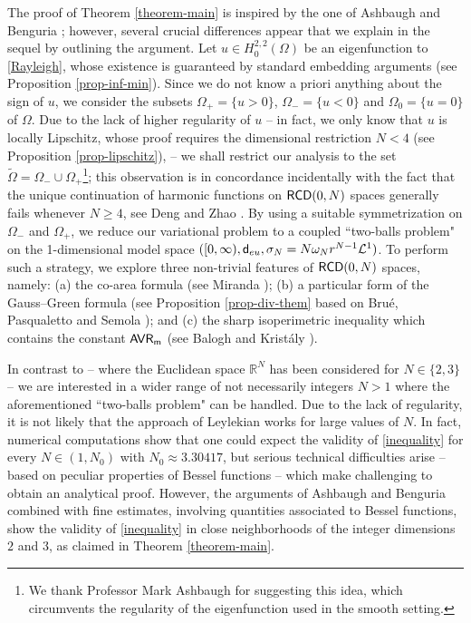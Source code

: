 \documentclass[11pt, reqno]{amsart}
\numberwithin{equation}{section}
\begin{document}
	
		
		The proof of Theorem \ref{theorem-main} is inspired by  the one of Ashbaugh and Benguria \cite{A-B-Duke}; however, several crucial differences appear that we explain in the sequel by outlining the argument. Let $u\in H_0^{2,2}(\Omega)$ be an eigenfunction to \eqref{Rayleigh}, whose existence is guaranteed by standard embedding arguments (see Proposition \ref{prop-inf-min}). Since we do not know a priori anything about the sign of $u$, we consider the subsets $\Omega_+=\{u>0\}$,  $\Omega_-=\{u<0\}$ and $\Omega_0=\{u=0\}$ of $\Omega.$ Due to the lack of higher regularity of $u$ -- in fact, we only know that $u$ is locally Lipschitz, whose proof requires the dimensional restriction $N<4$ (see Proposition \ref{prop-lipschitz}), -- we shall restrict our analysis to the set $\tilde \Omega=\Omega_-\cup \Omega_+$\footnote{We thank Professor Mark Ashbaugh for suggesting  this idea, which circumvents the regularity of the eigenfunction used in the smooth setting.};
		this observation is in concordance incidentally  with  the fact that the unique continuation of harmonic functions on ${\sf RCD}(0,N)$ spaces generally fails whenever $N\geq 4$, see Deng and Zhao \cite{Deng-Zhao}. By using a suitable symmetrization on $\Omega_-$ and $\Omega_+$, we reduce our variational problem to a coupled  ``two-balls problem"  on the 1-dimensional model space $([0,\infty),{\sf d}_{\rm eu},\sigma_N=N\omega_Nr^{N-1}\mathcal L^1)$. To perform such a strategy, we explore three non-trivial features of ${\sf RCD}(0,N)$ spaces, namely: (a) the co-area formula (see Miranda  \cite{Miranda});  (b) a particular form of the Gauss--Green formula (see Proposition \ref{prop-div-them} based on Bru\'e, Pasqualetto and Semola \cite{BPS-ASNS}); and (c) the sharp isoperimetric inequality which contains the constant ${\sf AVR}_ {\sf m}$  (see Balogh and Krist\'aly \cite{BK}). 
				
		 In contrast to \cite{A-B-Duke} -- where the Euclidean space $\mathbb R^N$ has been considered for $N\in \{2,3\}$ -- we are interested in a wider range of not necessarily integers $N>1$  where the aforementioned ``two-balls problem" can be handled. Due to the lack of regularity, it is not likely that the approach of Leylekian \cite{Leylekian-ARMA} works for large values of $N$. In fact, numerical computations show that one could expect the validity of \eqref{inequality} for every $N\in (1,N_0)$ with $N_0\approx 3.30417$, but serious technical difficulties arise -- based on  peculiar properties of Bessel functions --   which make challenging to obtain an analytical proof. However, the arguments of Ashbaugh and Benguria \cite{A-B-Duke} combined with fine estimates, involving quantities associated to Bessel functions, show  the validity of \eqref{inequality} in  close neighborhoods of the integer dimensions $2$ and $3$, as  claimed in  Theorem \ref{theorem-main}. 
		 
\end{document}
